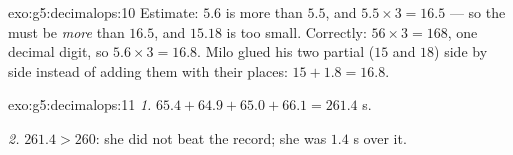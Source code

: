 \begin{solution}{exo:g5:decimalops:10}
Estimate: $5.6$ is more than $5.5$, and $5.5 \times 3 = 16.5$ --- so
the  must be \emph{more} than $16.5$, and $15.18$ is too
small. Correctly: $56 \times 3 = 168$, one decimal digit, so
$5.6 \times 3 = 16.8$. Milo glued his two partial  ($15$ and
$18$) side by side instead of adding them with their places:
$15 + 1.8 = 16.8$.
\end{solution}

\begin{solution}{exo:g5:decimalops:11}
\emph{1.} $65.4 + 64.9 + 65.0 + 66.1 = 261.4$ s.

\emph{2.} $261.4 > 260$: she did not beat the record; she was
$1.4$ s over it.
\end{solution}
